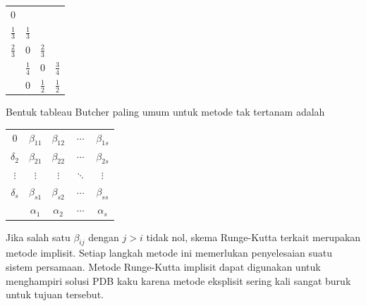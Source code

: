 \begin{center}
\begin{tabular}{c|ccc}
0 &  &  & \tabularnewline
$\frac{1}{3}$ & $\frac{1}{3}$ &  & \tabularnewline
$\frac{2}{3}$ & 0 & $\frac{2}{3}$ & \tabularnewline
\hline 
 & $\frac{1}{4}$ & 0 & $\frac{3}{4}$\tabularnewline
\hline 
 & 0 & $\frac{1}{2}$ & $\frac{1}{2}$\tabularnewline
\end{tabular}
\par\end{center}

\noindent Bentuk tableau Butcher paling umum untuk metode tak tertanam
adalah

\begin{center}
\begin{tabular}{c|cccc}
0 & $\beta_{11}$ & $\beta_{12}$ & $\cdots$ & $\beta_{1s}$\tabularnewline
$\delta_{2}$ & $\beta_{21}$ & $\beta_{22}$ & $\cdots$ & $\beta_{2s}$\tabularnewline
$\vdots$ & $\vdots$ & $\vdots$ & $\ddots$ & $\vdots$\tabularnewline
$\delta_{s}$ & $\beta_{s1}$ & $\beta_{s2}$ & $\cdots$ & $\beta_{ss}$\tabularnewline
\hline 
 & $\alpha_{1}$ & $\alpha_{2}$ & $\cdots$ & $\alpha_{s}$\tabularnewline
\end{tabular}
\par\end{center}

\noindent Jika salah satu $\beta_{ij}$ dengan $j>i$ tidak nol, skema
Runge-Kutta terkait merupakan metode implisit. Setiap langkah metode
ini memerlukan penyelesaian suatu sistem persamaan. Metode Runge-Kutta
implisit dapat digunakan untuk menghampiri solusi PDB kaku karena
metode eksplisit sering kali sangat buruk untuk tujuan tersebut.

